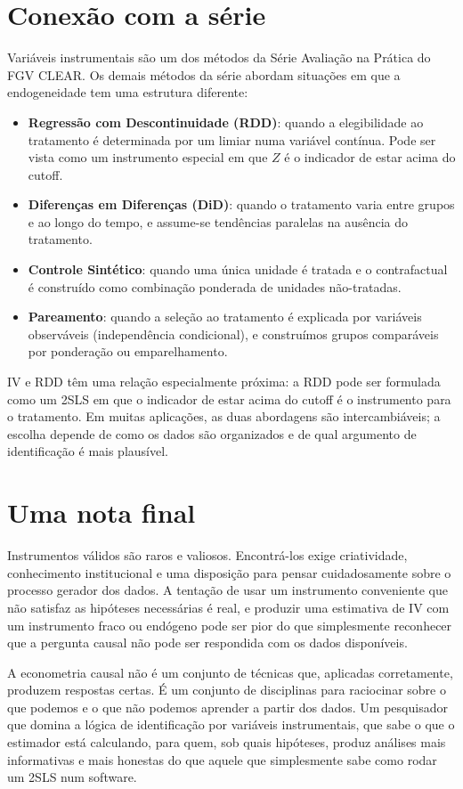 \section{Conexão com a série}
\label{sec:conexao}

\begin{conexaobox}
Variáveis instrumentais são um dos métodos da Série Avaliação na Prática do FGV CLEAR. Os demais métodos da série abordam situações em que a endogeneidade tem uma estrutura diferente:

\begin{itemize}[leftmargin=*]
  \item \textbf{Regressão com Descontinuidade (RDD)}: quando a elegibilidade ao tratamento é determinada por um limiar numa variável contínua. Pode ser vista como um instrumento especial em que $Z$ é o indicador de estar acima do cutoff.
  \item \textbf{Diferenças em Diferenças (DiD)}: quando o tratamento varia entre grupos e ao longo do tempo, e assume-se tendências paralelas na ausência do tratamento.
  \item \textbf{Controle Sintético}: quando uma única unidade é tratada e o contrafactual é construído como combinação ponderada de unidades não-tratadas.
  \item \textbf{Pareamento}: quando a seleção ao tratamento é explicada por variáveis observáveis (independência condicional), e construímos grupos comparáveis por ponderação ou emparelhamento.
\end{itemize}

IV e RDD têm uma relação especialmente próxima: a RDD pode ser formulada como um 2SLS em que o indicador de estar acima do cutoff é o instrumento para o tratamento. Em muitas aplicações, as duas abordagens são intercambiáveis; a escolha depende de como os dados são organizados e de qual argumento de identificação é mais plausível.
\end{conexaobox}

\section*{Uma nota final}

Instrumentos válidos são raros e valiosos. Encontrá-los exige criatividade, conhecimento institucional e uma disposição para pensar cuidadosamente sobre o processo gerador dos dados. A tentação de usar um instrumento conveniente que não satisfaz as hipóteses necessárias é real, e produzir uma estimativa de IV com um instrumento fraco ou endógeno pode ser pior do que simplesmente reconhecer que a pergunta causal não pode ser respondida com os dados disponíveis.

A econometria causal não é um conjunto de técnicas que, aplicadas corretamente, produzem respostas certas. É um conjunto de disciplinas para raciocinar sobre o que podemos e o que não podemos aprender a partir dos dados. Um pesquisador que domina a lógica de identificação por variáveis instrumentais, que sabe o que o estimador está calculando, para quem, sob quais hipóteses, produz análises mais informativas e mais honestas do que aquele que simplesmente sabe como rodar um 2SLS num software.
